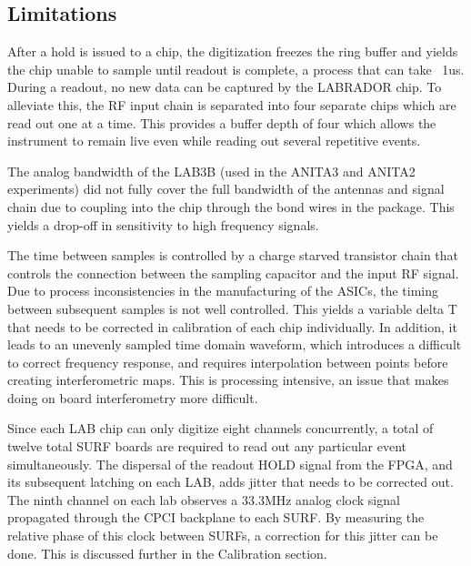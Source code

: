 	
	
	\subsection{Limitations}
	After a hold is issued to a chip, the digitization freezes the ring buffer and yields the chip unable to sample until readout is complete, a process that can take ~1us.  During a readout, no new data can be captured by the LABRADOR chip.  To alleviate this, the RF input chain is separated into four separate chips which are read out one at a time.  This provides a buffer depth of four which allows the instrument to remain live even while reading out several repetitive events.
	
	The analog bandwidth of the LAB3B (used in the ANITA3 and ANITA2 experiments) did not fully cover the full bandwidth of the antennas and signal chain due to coupling into the chip through the bond wires in the package.  This yields a drop-off in sensitivity to high frequency signals.  
	
	The time between samples is controlled by a charge starved transistor chain that controls the connection between the sampling capacitor and the input RF signal.  Due to process inconsistencies in the manufacturing of the ASICs, the timing between subsequent samples is not well controlled.  This yields a variable delta T that needs to be corrected in calibration of each chip individually.  In addition, it leads to an unevenly sampled time domain waveform, which introduces a difficult to correct frequency response, and requires interpolation between points before creating interferometric maps.  This is processing intensive, an issue that makes doing on board interferometry more difficult.
	
 	Since each LAB chip can only digitize eight channels concurrently, a total of twelve total SURF boards are required to read out any particular event simultaneously.  The dispersal of the readout HOLD signal from the FPGA, and its subsequent latching on each LAB, adds jitter that needs to be corrected out.  The ninth channel on each lab observes a 33.3MHz analog clock signal propagated through the CPCI backplane to each SURF.  By measuring the relative phase of this clock between SURFs, a correction for this jitter can be done.  This is discussed further in the Calibration section.
	
